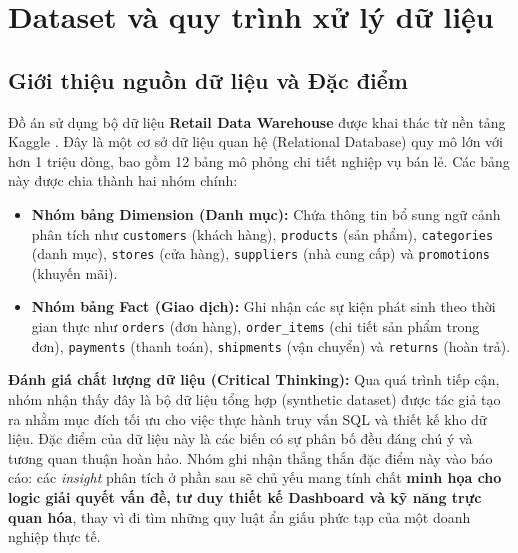 \section{Dataset và quy trình xử lý dữ liệu}

\subsection{Giới thiệu nguồn dữ liệu và Đặc điểm}
Đồ án sử dụng bộ dữ liệu \textbf{Retail Data Warehouse} được khai thác từ nền tảng Kaggle \cite{kaggle_retail}. Đây là một cơ sở dữ liệu quan hệ (Relational Database) quy mô lớn với hơn 1 triệu dòng, bao gồm 12 bảng mô phỏng chi tiết nghiệp vụ bán lẻ. Các bảng này được chia thành hai nhóm chính:
\begin{itemize}
    \item \textbf{Nhóm bảng Dimension (Danh mục):} Chứa thông tin bổ sung ngữ cảnh phân tích như \texttt{customers} (khách hàng), \texttt{products} (sản phẩm), \texttt{categories} (danh mục), \texttt{stores} (cửa hàng), \texttt{suppliers} (nhà cung cấp) và \texttt{promotions} (khuyến mãi).
    \item \textbf{Nhóm bảng Fact (Giao dịch):} Ghi nhận các sự kiện phát sinh theo thời gian thực như \texttt{orders} (đơn hàng), \texttt{order\_items} (chi tiết sản phẩm trong đơn), \texttt{payments} (thanh toán), \texttt{shipments} (vận chuyển) và \texttt{returns} (hoàn trả).
\end{itemize}

\textbf{Đánh giá chất lượng dữ liệu (Critical Thinking):} Qua quá trình tiếp cận, nhóm nhận thấy đây là bộ dữ liệu tổng hợp (synthetic dataset) được tác giả tạo ra nhằm mục đích tối ưu cho việc thực hành truy vấn SQL và thiết kế kho dữ liệu. Đặc điểm của dữ liệu này là các biến có sự phân bố đều đáng chú ý và tương quan thuận hoàn hảo. Nhóm ghi nhận thẳng thắn đặc điểm này vào báo cáo: các \textit{insight} phân tích ở phần sau sẽ chủ yếu mang tính chất \textbf{minh họa cho logic giải quyết vấn đề, tư duy thiết kế Dashboard và kỹ năng trực quan hóa}, thay vì đi tìm những quy luật ẩn giấu phức tạp của một doanh nghiệp thực tế.

